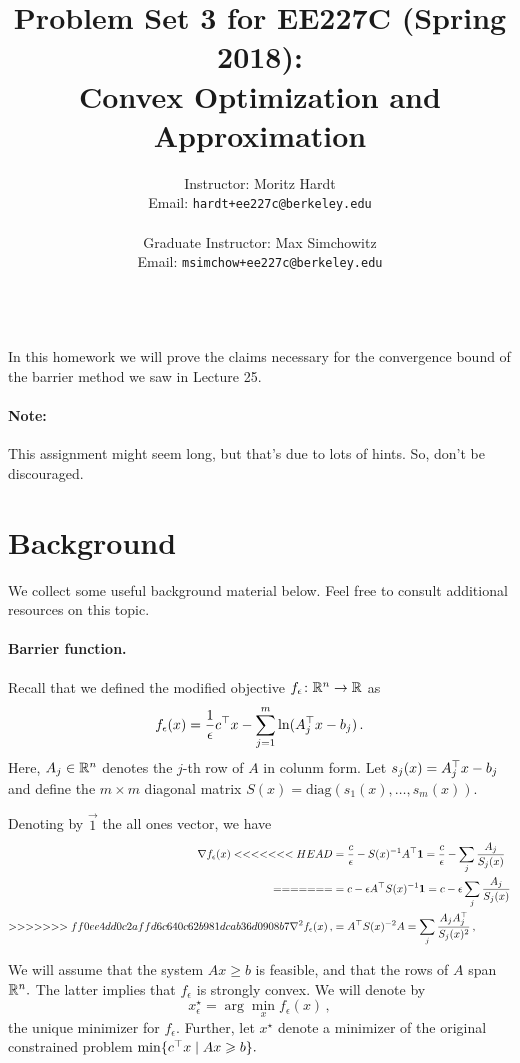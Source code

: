 \documentclass[12pt]{article}
\title{Problem Set 3 for EE227C (Spring 2018):\\
 Convex Optimization and Approximation }
\author{Instructor: Moritz Hardt\\
{\small Email: \tt hardt+ee227c@berkeley.edu}\\ ~\\
Graduate Instructor: Max Simchowitz\\
{\small Email: \tt msimchow+ee227c@berkeley.edu}\\ ~\\
}
\begin{document}



\maketitle

In this homework we will prove the claims necessary for the convergence bound of
the barrier method we saw in Lecture 25.

\paragraph{Note:} This assignment might seem long, but that's due to lots of
hints. So, don't be discouraged.

\section*{Background}

We collect some useful background material below. Feel free to consult
additional resources on this topic.

\paragraph{Barrier function.}
Recall that we defined the modified objective $f_\epsilon\colon\mathbb{R}^n\to\mathbb{R}$ as
\[
f_\epsilon(x) = \frac{1}{\epsilon} c^\top x - \sum_{j=1}^m \ln(A_j^\top x - b_j)\,.
\]
Here, $A_j\in\mathbb{R}^n$ denotes the $j$-th row of $A$ in colunm form.
Let $s_j(x)= A_j^\top x-b_j$ and define the $m\times m$ diagonal matrix
$S(x)=\mathrm{diag}(s_1(x),\dots,s_m(x)).$

Denoting by $\vec{1}$ the all ones vector, we have
\begin{align*}
\nabla f_\epsilon(x) 
<<<<<<< HEAD
&= \frac{c}{\epsilon} - S(x)^{-1}A^\top{\bm{1}}
= \frac{c}{\epsilon} - \sum_j \frac{A_j}{S_j(x)}\\
=======
&= c - \epsilon A^\top S(x)^{-1}{\bm{1}}
= c - \epsilon\sum_j \frac{A_j}{S_j(x)}\\
>>>>>>> ff0ee4dd0c2affd6c640c62b981dcab36d0908b7
\nabla^2 f_\epsilon(x) \,,
& =  A^\top S(x)^{-2} A
=  \sum_j \frac{A_jA_j^\top}{S_j(x)^2}\,,
\end{align*}

We will assume that the system $Ax\ge b$ is feasible, and that the rows of $A$
span~$\mathbb{R}^n.$ The latter implies that $f_\epsilon$ is strongly convex. We will denote
by
\[
x_\epsilon^\star=\arg\min_x f_\epsilon(x)\,,
\]
the unique minimizer for $f_\epsilon.$ Further, let $x^\star$ denote a minimizer
of the original constrained problem $\min\{c^\top x\mid Ax\geqslant b\}.$
\end{document}
